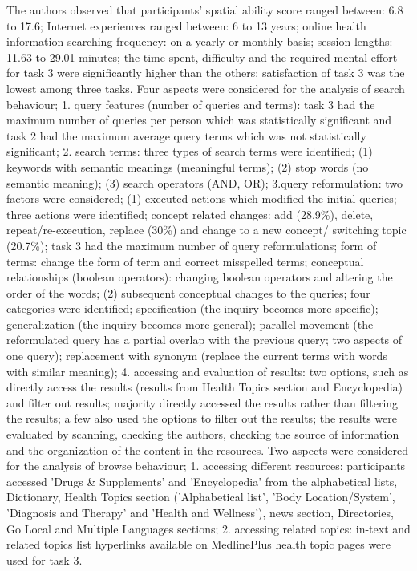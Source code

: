 \documentclass[]{article}
\begin{document}
The authors observed that participants' spatial ability score ranged between: 6.8 to 17.6; Internet experiences ranged between: 6 to 13 years; online health information searching frequency: on a yearly or monthly basis; session lengths: 11.63 to 29.01 minutes; the time spent, difficulty and the required mental effort for task 3 were significantly higher than the others; satisfaction of task 3 was the lowest among three tasks. Four aspects were considered for the analysis of search behaviour; 1. query features (number of queries and terms): task 3 had the maximum number of queries per person which was statistically significant and task 2 had the maximum average query terms which was not statistically significant; 2. search terms: three types of search terms were identified; (1) keywords with semantic meanings (meaningful terms); (2) stop words (no semantic meaning); (3) search operators (AND, OR); 3.query reformulation: two factors were considered; (1) executed actions which modified the initial queries; three actions were identified; concept related changes: add (28.9\%), delete, repeat/re-execution, replace (30\%) and change to a new concept/ switching topic (20.7\%); task 3 had the maximum number of query reformulations; form of terms: change the form of term and correct misspelled terms; conceptual relationships (boolean operators): changing boolean operators and altering the order of the words; (2) subsequent conceptual changes to the queries; four categories were identified; specification (the inquiry becomes more specific); generalization (the inquiry becomes more general); parallel movement (the reformulated query has a partial overlap with the previous query; two aspects of one query); replacement with synonym (replace the current terms with words with similar meaning); 4. accessing and evaluation of results: two options, such as directly access the results (results from Health Topics section and Encyclopedia) and filter out results; majority directly accessed the results rather than filtering the results; a few also used the options to filter out the results; the results were evaluated by scanning, checking the authors, checking the source of information and the organization of the content in the resources. Two aspects were considered for the analysis of browse behaviour; 1. accessing different resources: participants accessed 'Drugs \& Supplements' and 'Encyclopedia' from the alphabetical lists, Dictionary, Health Topics section ('Alphabetical list', 'Body Location/System', 'Diagnosis and Therapy' and 'Health and Wellness'), news section,  Directories, Go Local and Multiple Languages sections; 2. accessing related topics: in-text and related topics list hyperlinks available on MedlinePlus health topic pages were used for task 3. 
\end{document}

